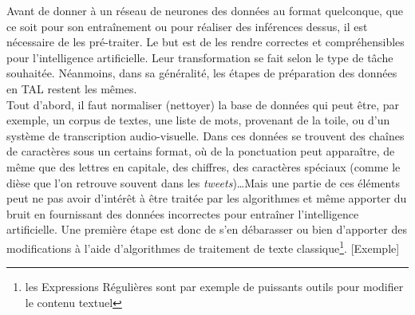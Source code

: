 \documentclass[12pt, french, twoside]{report}
\begin{document}
Avant de donner à un réseau de neurones des données au format quelconque, que ce soit pour son entraînement ou pour réaliser des inférences dessus, il est nécessaire de les pré-traiter. Le but est de les rendre correctes et compréhensibles pour l'intelligence artificielle. Leur transformation se fait selon le type de tâche souhaitée. Néanmoins, dans sa généralité, les étapes de préparation des données en TAL restent les mêmes.\\

Tout d'abord, il faut normaliser (nettoyer) la base de données qui peut être, par exemple, un corpus de textes, une liste de mots, provenant de la toile, ou d'un système de transcription audio-visuelle. Dans ces données se trouvent des chaînes de caractères sous un certains format, où de la ponctuation peut apparaître, de même que des lettres en capitale, des chiffres, des caractères spéciaux (comme le dièse que l'on retrouve souvent dans les \textit{tweets})\dots Mais une partie de ces éléments peut ne pas avoir d'intérêt à être traitée par les algorithmes et même apporter du bruit en fournissant des données incorrectes pour entraîner l'intelligence artificielle. Une première étape est donc de s'en débarasser ou bien d'apporter des modifications à l'aide d'algorithmes de traitement de texte classique\footnote{les Expressions Régulières sont par exemple de puissants outils pour modifier le contenu textuel}.\cite{jurafsky_regular} [Exemple]\\
\end{document}
